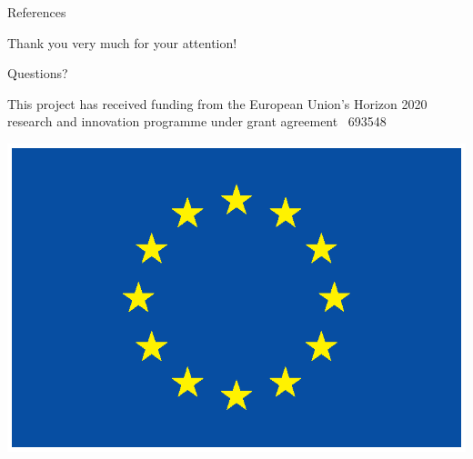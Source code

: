 \documentclass[xcolor=x11names, aspectratio=169,usenames,dvipsnames]{beamer}
\begin{document}
\begin{frame}{References}

\printbibliography[heading=none]
\end{frame}


\begin{frame}[plain]
\vfill\vfill\vfill
\begin{center}\Large
Thank you very much for your attention!\\\bigskip

Questions?
\end{center}\vfill\vfill

\hfill
\begin{minipage}{0.7\textwidth}\scriptsize
\begin{flushright}
This project has received funding from the European Union's Horizon 2020 research and innovation programme under grant agreement \textnumero\ 693548
\end{flushright}
\end{minipage}\hspace*{1em}
\begin{minipage}{0.1\textwidth}
\includegraphics[width=\textwidth]{img/eu_flag.ps}
\end{minipage}
\end{frame}

\maketitle
\end{document}
